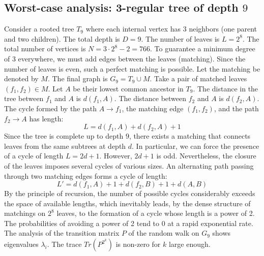 \documentclass[11pt,a4paper]{article}
\begin{document}
\subsection{Worst-case analysis: 3-regular tree of depth $9$}
Consider a rooted tree $T_{9}$ where each internal vertex has 3 neighbors (one parent and two children).
The total depth is $D = 9$.
The number of leaves is $L = 2^{8}$.
The total number of vertices is $N = 3 \cdot 2^{8} - 2 = 766$.
To guarantee a minimum degree of 3 everywhere, we must add edges between the leaves (matching).
Since the number of leaves is even, such a perfect matching is possible.
Let the matching be denoted by $M$. The final graph is $G_{9} = T_{9} \cup M$.
Take a pair of matched leaves $(f_1, f_2) \in M$.
Let $A$ be their lowest common ancestor in $T_{9}$.
The distance in the tree between $f_1$ and $A$ is $d(f_1, A)$.
The distance between $f_2$ and $A$ is $d(f_2, A)$.
The cycle formed by the path $A \to f_1$, the matching edge $(f_1, f_2)$, and the path $f_2 \to A$ has length:
$$ L = d(f_1, A) + d(f_2, A) + 1 $$
Since the tree is complete up to depth $9$, there exists a matching that connects leaves from the same subtrees at depth $d$.
In particular, we can force the presence of a cycle of length $L = 2d + 1$. However, $2d+1$ is odd.
Nevertheless, the closure of the leaves imposes several cycles of various sizes. An alternating path passing through two matching edges forms a cycle of length:
$$ L' = d(f_1, A) + 1 + d(f_2, B) + 1 + d(A, B) $$
By the principle of recursion, the number of possible cycles considerably exceeds the space of available lengths, which inevitably leads, by the dense structure of matchings on $2^{8}$ leaves, to the formation of a cycle whose length is a power of 2. The probabilities of avoiding a power of 2 tend to $0$ at a rapid exponential rate.
The analysis of the transition matrix $P$ of the random walk on $G_{9}$ shows eigenvalues $\lambda_i$. The trace $Tr(P^{2^k})$ is non-zero for $k$ large enough.
\end{document}
